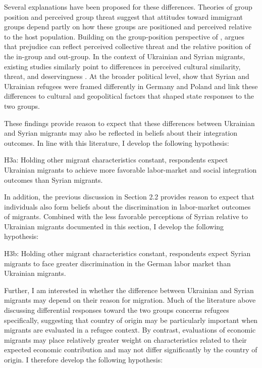 Several explanations have been proposed for these differences. Theories of group position and perceived group threat 
suggest that attitudes toward immigrant groups depend partly on how these groups are positioned and perceived relative 
to the host population. Building on the group-position perspective of \citet{blumer1958race}, \citet{quillian1995prejudice} 
argues that prejudice can reflect perceived collective threat and the relative position of the in-group and out-group. 
In the context of Ukrainian and Syrian migrants, existing studies similarly point to differences in perceived cultural 
similarity, threat, and deservingness \citep{echterhoff2023gefluchtete,
schmidt2024hierarchien, stefaniak2025double}. At the broader political level, \citet{drewski2025states} show that 
Syrian and Ukrainian refugees were framed differently in Germany and Poland and link these differences to cultural 
and geopolitical factors that shaped state responses to the two groups.

These findings provide reason to expect that these differences between Ukrainian and Syrian migrants may also be 
reflected in beliefs about their integration outcomes. In line with this literature, 
I develop the following hypothesis: \bigskip

H3a: Holding other migrant characteristics constant, respondents expect Ukrainian migrants to achieve more favorable 
labor-market and social integration outcomes than Syrian migrants. \bigskip

In addition, the previous discussion in Section 2.2 provides reason to expect that individuals also form beliefs 
about the discrimination in labor-market outcomes of migrants. Combined with the less favorable perceptions of Syrian 
relative to Ukrainian migrants documented in this section, I develop the following hypothesis: \bigskip

H3b: Holding other migrant characteristics constant, respondents expect Syrian migrants to face greater discrimination 
in the German labor market than Ukrainian migrants.\bigskip

Further, I am interested in whether the difference between Ukrainian and Syrian migrants may depend on their reason for 
migration.
Much of the literature above discussing differential responses toward the two groups concerns refugees specifically, 
suggesting that country of origin may be particularly important when migrants are evaluated in a refugee context. 
By contrast, evaluations of economic migrants may place relatively greater weight on characteristics related to their 
expected economic contribution and may not differ significantly by the country of origin. I therefore develop the 
following hypothesis: \bigskip

